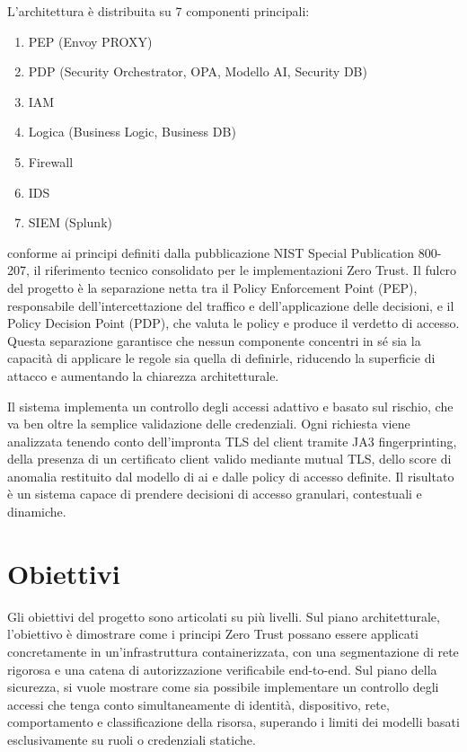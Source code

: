 L'architettura è distribuita su 7 componenti principali:
\begin{enumerate}
    \item PEP (Envoy PROXY)
    \item PDP (Security Orchestrator, OPA, Modello AI, Security DB)
    \item IAM 
    \item Logica (Business Logic, Business DB)
    \item Firewall
    \item IDS 
    \item SIEM (Splunk)
\end{enumerate} 
conforme ai principi definiti dalla pubblicazione NIST Special Publication 800-207, il riferimento tecnico consolidato per le implementazioni Zero Trust. Il fulcro del progetto è la separazione netta tra il Policy Enforcement Point (PEP), responsabile dell'intercettazione del traffico e dell'applicazione delle decisioni, e il Policy Decision Point (PDP), che valuta le policy e produce il verdetto di accesso. Questa separazione garantisce che nessun componente concentri in sé sia la capacità di applicare le regole sia quella di definirle, riducendo la superficie di attacco e aumentando la chiarezza architetturale.

Il sistema implementa un controllo degli accessi adattivo e basato sul rischio, che va ben oltre la semplice validazione delle credenziali. Ogni richiesta viene analizzata tenendo conto dell'impronta TLS del client tramite JA3 fingerprinting, della presenza di un certificato client valido mediante mutual TLS, dello score di anomalia restituito dal modello di ai e dalle policy di accesso definite. Il risultato è un sistema capace di prendere decisioni di accesso granulari, contestuali e dinamiche.

\section{Obiettivi}

Gli obiettivi del progetto sono articolati su più livelli. Sul piano architetturale, l'obiettivo è dimostrare come i principi Zero Trust possano essere applicati concretamente in un'infrastruttura containerizzata, con una segmentazione di rete rigorosa e una catena di autorizzazione verificabile end-to-end. Sul piano della sicurezza, si vuole mostrare come sia possibile implementare un controllo degli accessi che tenga conto simultaneamente di identità, dispositivo, rete, comportamento e classificazione della risorsa, superando i limiti dei modelli basati esclusivamente su ruoli o credenziali statiche.

